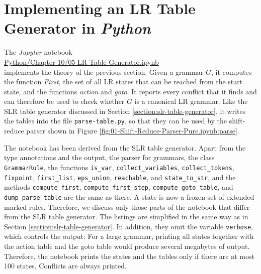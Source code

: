 \section{Implementing an LR Table Generator in \textsl{Python}\label{section:lr-table-generator}}
The \textsl{Jupyter} notebook
\\[0.2cm]
\hspace*{1.3cm}
\href{https://github.com/karlstroetmann/Formal-Languages/blob/master/Python/Chapter-10/05-LR-Table-Generator.ipynb}{Python/Chapter-10/05-LR-Table-Generator.ipynb}
\\[0.2cm]
implements the theory of the previous section.  Given a grammar $G$, it computes the function \textsl{First}, the
set of all LR states that can be reached from the start state, and the functions \textsl{action} and
\textsl{goto}.  It reports every conflict that it finds and can therefore be used to check whether $G$ is a
canonical LR grammar.  Like the SLR table generator discussed in Section \ref{section:slr-table-generator}, it
writes the tables into the file \texttt{parse-table.py}, so that they can be used by the shift-reduce parser shown
in Figure \ref{fig:01-Shift-Reduce-Parser-Pure.ipynb:parse}.

The notebook has been derived from the SLR table generator.  Apart from the type annotations and the output, the
parser for grammars, the class \texttt{GrammarRule}, the functions \texttt{is\_var}, \texttt{collect\_variables},
\texttt{collect\_tokens}, \texttt{fixpoint}, \texttt{first\_list}, \texttt{eps\_union}, \texttt{reachable}, and
\texttt{state\_to\_str}, and the methods \texttt{compute\_first}, \texttt{compute\_first\_step},
\texttt{compute\_goto\_table}, and \texttt{dump\_parse\_table} are the same as there.  A state is now a frozen set
of extended marked rules.  Therefore, we discuss only those parts of the notebook that differ from the SLR table generator.  The listings are simplified in the same way as in Section \ref{section:slr-table-generator}.  In
addition, they omit the variable \texttt{verbose}, which controls the output:  For a large grammar, printing all
states together with the action table and the goto table would produce several megabytes of output.  Therefore,
the notebook prints the states and the tables only if there are at most 100 states.  Conflicts are always printed.

